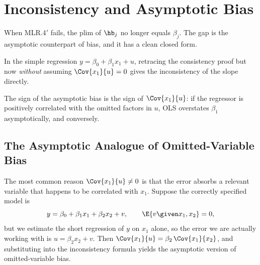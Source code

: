 \section{Inconsistency and Asymptotic Bias}

When MLR.4$'$ fails, the plim of $\hb_j$ no longer equals $\beta_j$. The gap is the asymptotic counterpart of bias, and it has a clean closed form.


In the simple regression $y=\beta_0+\beta_1 x_1 + u$, retracing the consistency proof but now \emph{without} assuming $\Cov{x_1}{u}=0$ gives the inconsistency of the slope directly.


The sign of the asymptotic bias is the sign of $\Cov{x_1}{u}$: if the regressor is positively correlated with the omitted factors in $u$, OLS overstates $\beta_1$ asymptotically, and conversely.

\subsection{The Asymptotic Analogue of Omitted-Variable Bias}

The most common reason $\Cov{x_1}{u}\neq 0$ is that the error absorbs a relevant variable that happens to be correlated with $x_1$. Suppose the correctly specified model is
\[
y = \beta_0 + \beta_1 x_1 + \beta_2 x_2 + v,
\qquad \E{v\given x_1,x_2}=0,
\]
but we estimate the short regression of $y$ on $x_1$ alone, so the error we are actually working with is $u = \beta_2 x_2 + v$. Then $\Cov{x_1}{u}=\beta_2\,\Cov{x_1}{x_2}$, and substituting into the inconsistency formula yields the asymptotic version of omitted-variable bias.


